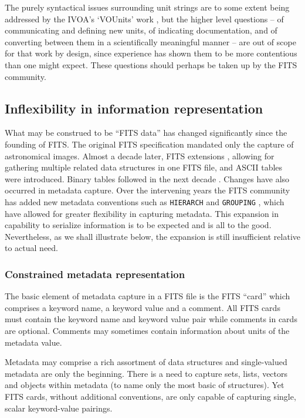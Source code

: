 \documentclass[final,authoryear,5p,times,twocolumn]{elsarticle}
\begin{document}
{{The purely syntactical issues surrounding unit strings are to some
extent being addressed by the IVOA's `VOUnits' work \citep{VOUnits}, but the higher
level questions -- of communicating and defining new units, of
indicating documentation, and of converting between them in a
scientifically meaningful manner -- are out of scope for that work by
design, since experience has shown them to be more contentious than
one might expect.  These questions should perhaps be taken up by the FITS community.


\subsection{Inflexibility in information representation}
\label{section_inflex_represent}


What may be construed to be ``FITS data'' has changed significantly
since the founding of FITS. The original FITS specification mandated
only the capture of astronomical images. Almost a decade later, FITS
extensions \citep{1988A&AS...73..359G}, allowing for gathering
multiple related data structures in one FITS file, and ASCII tables
\citep{1988A&AS...73..365H} were introduced. Binary tables followed in
the next decade \citep{1995A&AS..113..159C}. Changes have also
occurred in metadata capture. Over the intervening years the FITS
community has added new metadata conventions such as \texttt{HIERARCH}
\citep{2009Wic} and \texttt{GROUPING} \citep{2007Jen}, which have
allowed for greater flexibility in capturing metadata.
This expansion in capability to serialize information is to be 
expected and is all to the good. Nevertheless, as we shall illustrate 
below, the expansion is still insufficient relative to actual need.


\subsubsection{Constrained metadata representation}
\label{subsection_information_representation}


The basic element of metadata capture in a FITS file is the FITS
``card'' which comprises a keyword name, a keyword value and a
comment. All FITS cards must contain the keyword name and keyword
value pair while comments in cards are optional. Comments may
sometimes contain information about units of the metadata value.

Metadata may comprise a rich assortment of data structures and
single-valued metadata are only the beginning. There is a need to
capture sets, lists, vectors and objects within metadata (to name only
the most basic of structures). Yet FITS cards, without additional
conventions, are only capable of capturing single, scalar keyword-value 
pairings. 

}}
\end{document}
